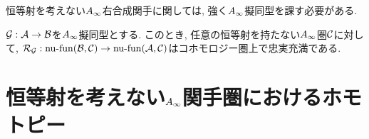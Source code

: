 \documentclass[uplatex, a4paper, 14Q, dvipdfmx]{jsarticle}
\begin{document}
恒等射を考えない$A_{\infty}$右合成関手に関しては, 強く$A_{\infty}$擬同型を課す必要がある. 

\begin{lemma} \label{prop_RG_is_also_cohomologically_fully_faithful}
  $\mathcal{G} :\mathcal{A} \to \mathcal{B}$を$A_{\infty}$擬同型とする. 
  このとき, 任意の恒等射を持たない$A_{\infty}$圏$\mathcal{C}$に対して, $\mathcal{R}_{\mathcal{G}} : \mathrm{nu} \text{-} \mathrm{fun} (\mathcal{B}, \mathcal{C}) \to \mathrm{nu} \text{-} \mathrm{fun} (\mathcal{A}, \mathcal{C})$はコホモロジー圏上で忠実充満である. 
\end{lemma}





\section{恒等射を考えない\texorpdfstring{$A_{\infty}$}{Ainf}関手圏におけるホモトピー}
\end{document}
